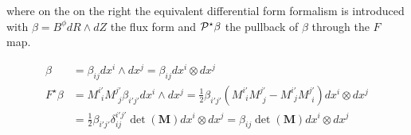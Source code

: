 where on the on the right the equivalent differential form formalism is introduced with $\beta = B^\phi dR\wedge dZ$ the flux form and $\mathcal{P}^\star\beta$ the pullback of $\beta$ through the $F$ map.

\begin{align*}
    \beta &= \beta_{ij}dx^i\wedge dx^j = \beta_{ij}dx^i\otimes dx^j\\
    F^\star\beta &= M^{i'}_{\,\:i}M^{j'}_{\,\:j}\beta_{i'j'}dx^i\wedge dx^j = \frac{1}{2}\beta_{i'j'}\left(M^{i'}_{\,\:i}M^{j'}_{\,\:j}-M^{i'}_{\,\:j}M^{j'}_{\,\:i}\right)dx^i\otimes dx^j\\ &= \frac{1}{2}\beta_{i'j'}\delta^{i'j'}_{ij} \det(\textbf{M})dx^i\otimes dx^j = \beta_{ij}\det(\textbf{M})dx^i\otimes dx^j
\end{align*}

